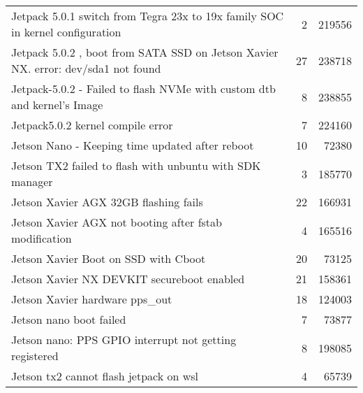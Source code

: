 \begin{longtable}{p{}rr}
    Jetpack 5.0.1 switch from Tegra 23x to 19x family SOC in kernel configuration                                                      & 2       & 219556 \\
    Jetpack 5.0.2 , boot from SATA SSD on Jetson Xavier NX. error: dev/sda1 not found                                                  & 27      & 238718 \\
    Jetpack-5.0.2 - Failed to flash NVMe with custom dtb and kernel’s Image                                                            & 8       & 238855 \\
    Jetpack5.0.2 kernel compile error                                                                                                  & 7       & 224160 \\
    Jetson Nano - Keeping time updated after reboot                                                                                    & 10      & 72380  \\
    Jetson TX2 failed to flash with unbuntu with SDK manager                                                                           & 3       & 185770 \\
    Jetson Xavier AGX 32GB flashing fails                                                                                              & 22      & 166931 \\
    Jetson Xavier AGX not booting after fstab modification                                                                             & 4       & 165516 \\
    Jetson Xavier Boot on SSD with Cboot                                                                                               & 20      & 73125  \\
    Jetson Xavier NX DEVKIT secureboot enabled                                                                                         & 21      & 158361 \\
    Jetson Xavier hardware pps\_out                                                                                                    & 18      & 124003 \\
    Jetson nano boot failed                                                                                                            & 7       & 73877  \\
    Jetson nano: PPS GPIO interrupt not getting registered                                                                             & 8       & 198085 \\
    Jetson tx2 cannot flash jetpack on wsl                                                                                             & 4       & 65739  \\

\end{longtable}

